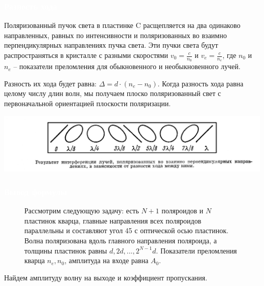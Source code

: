 \documentclass[aspectratio=169]{beamer}
\begin{document}
\begin{frame}
\frametitle{\textcolor{white}{Разность хода}}

Поляризованный пучок света в пластинке C расщепляется на два одинаково направленных, равных по интенсивности и поляризованных во взаимно перпендикулярных направлениях пучка света. Эти пучки света будут распространяться в кристалле с разными скоростями $v_0 = \frac{c}{n_0}$ и $v_e = \frac{c}{n_e}$, где $n_0$ и $n_e$ -- показатели преломления для обыкновенного и необыкновенного лучей. 



Разность их хода будет равна: $\Delta = d \cdot (n_e - n_0)$. Когда разность хода равна целому числу длин волн, мы получаем плоско поляризованный свет с первоначальной ориентацией плоскости поляризации.
    


\begin{center}
    \includegraphics[scale=0.4]{02.jpg}
\end{center}
\end{frame}

\begin{frame}
\frametitle{\textcolor{white}{Вывод формулы}}
\begin{figure}[h]
\begin{minipage}[h]{0.59\linewidth}
Рассмотрим следующую задачу: есть $N + 1$ поляроидов и $N$ пластинок кварца, главные направления всех поляроидов параллельны и составляют угол 45 \textdegree с оптической осью пластинок. Волна поляризована вдоль главного направления поляроида, а толщины пластинок равны $d, 2d, ..., 2^{N-1}d$. Показатели преломления кварца $n_e, n_0$, амплитуда на входе равна $A_0$.

\end{minipage}
\begin{minipage}[h]{0.39\linewidth}
\end{minipage}
\end{figure}

Найдем амплитуду волну на выходе и коэффициент пропускания.
\end{frame}
\end{document}
